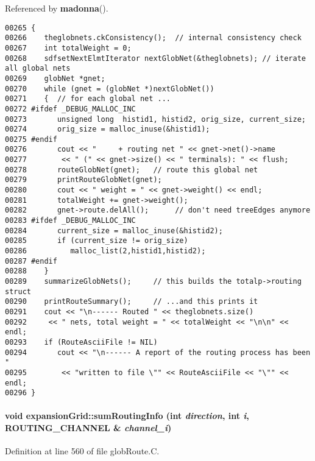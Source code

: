 Referenced by {\bf madonna}().\small\begin{verbatim}00265 {
00266    theglobnets.ckConsistency();  // internal consistency check
00267    int totalWeight = 0;
00268    sdfsetNextElmtIterator nextGlobNet(&theglobnets); // iterate all global nets
00269    globNet *gnet;
00270    while (gnet = (globNet *)nextGlobNet())
00271    {  // for each global net ...
00272 #ifdef _DEBUG_MALLOC_INC
00273       unsigned long  histid1, histid2, orig_size, current_size;
00274       orig_size = malloc_inuse(&histid1);
00275 #endif
00276       cout << "     + routing net " << gnet->net()->name
00277        << " (" << gnet->size() << " terminals): " << flush;
00278       routeGlobNet(gnet);   // route this global net
00279       printRouteGlobNet(gnet);
00280       cout << " weight = " << gnet->weight() << endl;
00281       totalWeight += gnet->weight();
00282       gnet->route.delAll();      // don't need treeEdges anymore
00283 #ifdef _DEBUG_MALLOC_INC
00284       current_size = malloc_inuse(&histid2);
00285       if (current_size != orig_size)
00286          malloc_list(2,histid1,histid2);
00287 #endif
00288    }
00289    summarizeGlobNets();     // this builds the totalp->routing struct
00290    printRouteSummary();     // ...and this prints it
00291    cout << "\n------ Routed " << theglobnets.size()
00292     << " nets, total weight = " << totalWeight << "\n\n" << endl;
00293    if (RouteAsciiFile != NIL)
00294       cout << "\n------ A report of the routing process has been "
00295        << "written to file \"" << RouteAsciiFile << "\"" << endl;
00296 }
\end{verbatim}\normalsize 
\label{expansionGrid_c6}
\paragraph{\setlength{\rightskip}{0pt plus 5cm}void expansion\-Grid::sum\-Routing\-Info (int {\em direction}, int {\em i}, {\bf ROUTING\_\-CHANNEL} \& {\em channel\_\-i})\hspace{0.3cm}{\tt  [private]}}\hfill



Definition at line 560 of file glob\-Route.C.

